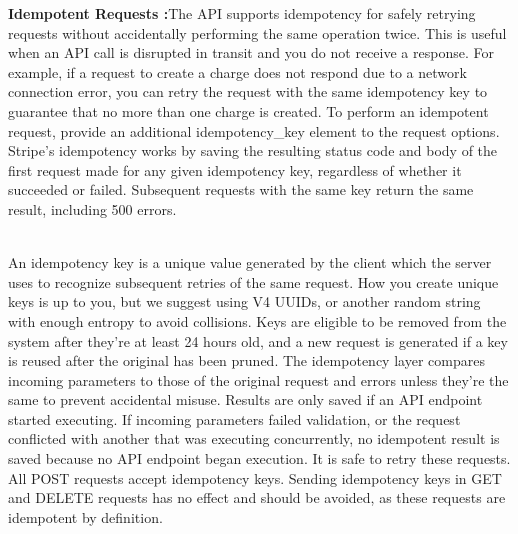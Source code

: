 \documentclass[12pt,a4paper]{report}
\begin{document}
\textbf{Idempotent Requests :}The API supports idempotency for safely retrying requests without accidentally performing the same operation twice. This is useful when an API call is disrupted in transit and you do not receive a response. For example, if a request to create a charge does not respond due to a network connection error, you can retry the request with the same idempotency key to guarantee that no more than one charge is created. To perform an idempotent request, provide an additional idempotency\_key element to the request options. Stripe's idempotency works by saving the resulting status code and body of the first request made for any given idempotency key, regardless of whether it succeeded or failed. Subsequent requests with the same key return the same result, including 500 errors. 
\\
\\
\par
An idempotency key is a unique value generated by the client which the server uses to recognize subsequent retries of the same request. How you create unique keys is up to you, but we suggest using V4 UUIDs, or another random string with enough entropy to avoid collisions. Keys are eligible to be removed from the system after they're at least 24 hours old, and a new request is generated if a key is reused after the original has been pruned. The idempotency layer compares incoming parameters to those of the original request and errors unless they're the same to prevent accidental misuse. Results are only saved if an API endpoint started executing. If incoming parameters failed validation, or the request conflicted with another that was executing concurrently, no idempotent result is saved because no API endpoint began execution. It is safe to retry these requests. All POST requests accept idempotency keys. Sending idempotency keys in GET and DELETE requests has no effect and should be avoided, as these requests are idempotent by definition.
\end{document}
